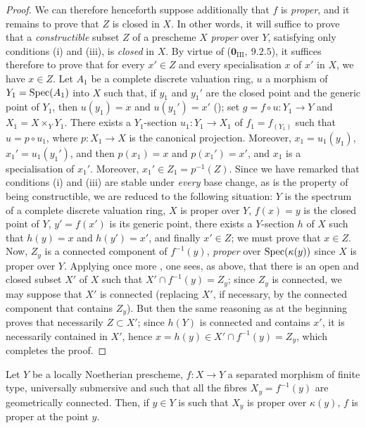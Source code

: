 \begin{proof}
We can therefore henceforth suppose additionally that $f$ is \emph{proper}, and it remains to prove that $Z$ is closed in $X$.
In other words, it will suffice to prove that a \emph{constructible} subset $Z$ of a prescheme $X$ \emph{proper} over $Y$, satisfying only conditions (i) and (iii), is \emph{closed} in $X$.
By virtue of ($\mathbf{0}_{\mathrm{III}},~9.2.5$), it suffices therefore to prove that for every $x'\in Z$ and every specialisation $x$ of $x'$ in $X$, we have $x\in Z$.
Let $A_1$ be a complete discrete valuation ring, $u$ a morphism of $Y_1=\operatorname{Spec}(A_1)$ into $X$ such that, if $y_1$ and $y_1'$ are the closed point and the generic point of $Y_1$, then $u(y_1)=x$ and $u(y_1')=x'$ (); set $g=f\circ u:Y_1\to Y$ and $X_1=X\times_Y Y_1$. There exists a $Y_1$-section $u_1:Y_1\to X_1$ of $f_1=f_{(Y_1)}$ such that $u=p\circ u_1$, where $p:X_1\to X$ is the canonical projection.
Moreover, $x_1=u_1(y_1)$, $x_1'=u_1(y_1')$, and then $p(x_1)=x$ and $p(x_1')=x'$, and $x_1$ is a specialisation of $x_1'$.
Moreover, $x_1'\in Z_1=p^{-1}(Z)$. Since we have remarked that conditions (i) and (iii) are stable under \emph{every} base change, as is the property of being constructible, we are reduced to the following situation: $Y$ is the spectrum of a complete discrete valuation ring, $X$ is proper over $Y$, $f(x)=y$ is the closed point of $Y$, $y'=f(x')$ is its generic point, there exists a $Y$-section $h$ of $X$ such that $h(y)=x$ and $h(y')=x'$, and finally $x'\in Z$; we must prove that $x\in Z$.
Now, $Z_y$ is a connected component of $f^{-1}(y)$, \emph{proper} over $\operatorname{Spec}(\kappa(y))$ since $X$ is proper over $Y$.
Applying once more , one sees, as above, that there is an open and closed subset $X'$ of $X$ such that $X'\cap f^{-1}(y)=Z_y$; since $Z_y$ is connected,
we may suppose that $X'$ is connected (replacing $X'$, if necessary, by the connected component that contains $Z_y$).
But then the same reasoning as at the beginning proves that necessarily $Z\subset X'$; since $h(Y)$ is connected and contains $x'$, it is necessarily contained in $X'$, hence $x=h(y)\in X'\cap f^{-1}(y)=Z_y$, which completes the proof.
\end{proof}

\begin{corollary}[15.7.10]
\label{IV.15.7.10}
Let $Y$ be a locally Noetherian prescheme, $f:X\to Y$ a separated morphism of finite type, universally submersive  and such that all the fibres $X_y=f^{-1}(y)$ are geometrically connected.
Then, if $y\in Y$ is such that $X_y$ is proper over $\kappa(y)$, $f$ is proper at the point $y$.
\end{corollary}

